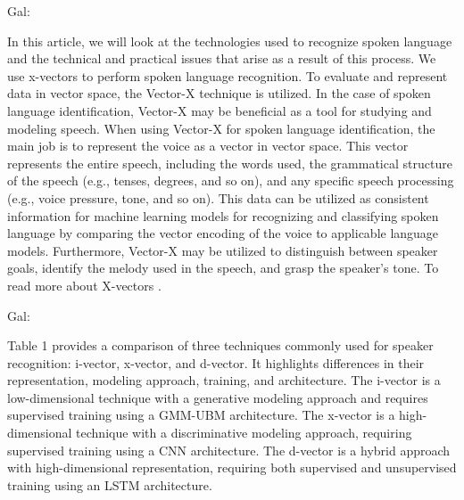 \documentclass[a4paper]{article}
\begin{document}
Gal:

In this article, we will look at the technologies used to recognize spoken language and the technical and practical issues that arise as a result of this process. We use x-vectors to perform spoken language recognition. To evaluate and represent data in vector space, the Vector-X technique is utilized. In the case of spoken language identification, Vector-X may be beneficial as a tool for studying and modeling speech. When using Vector-X for spoken language identification, the main job is to represent the voice as a vector in vector space. This vector represents the entire speech, including the words used, the grammatical structure of the speech (e.g., tenses, degrees, and so on), and any specific speech processing (e.g., voice pressure, tone, and so on). This data can be utilized as consistent information for machine learning models for recognizing and classifying spoken language by comparing the vector encoding of the voice to applicable language models. Furthermore, Vector-X may be utilized to distinguish between speaker goals, identify the melody used in the speech, and grasp the speaker’s tone. To read more about X-vectors \cite{raj2019probing}.

\begin{table}[ht]
\centering
\caption{Comparison of i-vector, x-vector, and d-vector}
\label{tab:vector-comparison}
\end{table}

Gal:

Table 1 provides a comparison of three techniques commonly used for speaker recognition: i-vector, x-vector, and d-vector. It highlights differences in their representation, modeling approach, training, and architecture. The i-vector is a low-dimensional technique with a generative modeling approach and requires supervised training using a GMM-UBM architecture. The x-vector is a high-dimensional technique with a discriminative modeling approach, requiring supervised training using a CNN architecture. The d-vector is a hybrid approach with high-dimensional representation, requiring both supervised and unsupervised training using an LSTM architecture.
\end{document}

